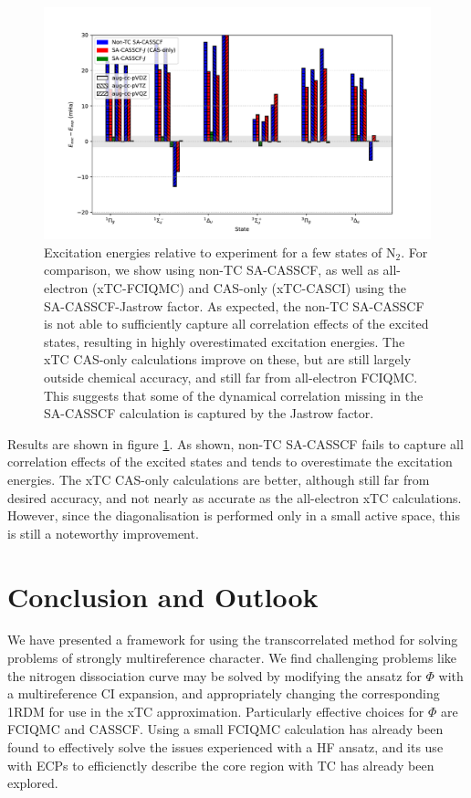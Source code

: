 \begin{figure}[htbp]
    \centering
    \includegraphics[width=\textwidth]{figures/binding/n2_exc_cas.pdf}
    \caption{Excitation energies relative to experiment for a few states of N$_2$. For comparison, we show using non-TC SA-CASSCF, as well as all-electron (xTC-FCIQMC) and CAS-only (xTC-CASCI) using the SA-CASSCF-Jastrow factor. As expected, the non-TC SA-CASSCF is not able to sufficiently capture all correlation effects of the excited states, resulting in highly overestimated excitation energies. The xTC CAS-only calculations improve on these, but are still largely outside chemical accuracy, and still far from all-electron FCIQMC. This suggests that some of the dynamical correlation missing in the SA-CASSCF calculation is captured by the Jastrow factor.
    }
    \label{fig:n2-excite-relative-cas}
\end{figure}

Results are shown in figure \ref{fig:n2-excite-relative-cas}. As shown, non-TC SA-CASSCF fails to capture all correlation effects of the excited states and tends to overestimate the excitation energies. The xTC CAS-only calculations are better, although still far from desired accuracy, and not nearly as accurate as the all-electron xTC calculations. However, since the diagonalisation is performed only in a small active space, this is still a noteworthy improvement.


\section{Conclusion and Outlook}

We have presented a framework for using the transcorrelated method for solving problems of strongly multireference character. We find challenging problems like the nitrogen dissociation curve may be solved by modifying the ansatz for $\Phi$ with a multireference CI expansion, and appropriately changing the corresponding 1RDM for use in the xTC approximation. Particularly effective choices for $\Phi$ are FCIQMC and CASSCF. Using a small FCIQMC calculation has already been found to effectively solve the issues experienced with a HF ansatz, and its use with \glspl{ECP} to efficienctly describe the core region with TC has already been explored.\supercite{simulaEcp}

